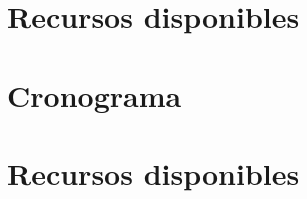 \documentclass[stu, 12pt, noextraspace, floatsintext]{apa7}
\begin{document}
\clearpage
\section{Recursos disponibles}


\clearpage
\section{Cronograma}


\clearpage
\printbibliography[{heading=bibintoc}]
\thispagestyle{otherplain}

\appendix
\section{Recursos disponibles}

\end{document}
